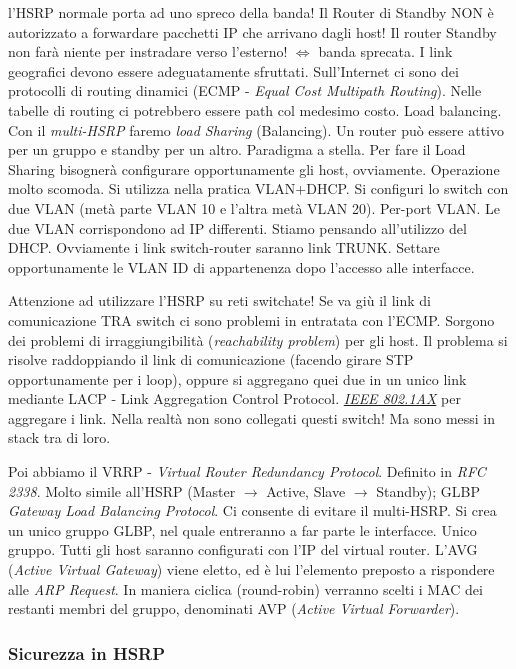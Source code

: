 l'HSRP normale porta ad uno spreco della banda! Il Router di Standby NON è autorizzato a forwardare pacchetti IP che arrivano dagli host! Il router Standby non farà niente per instradare verso l'esterno! $\iff$ banda sprecata. I link geografici devono essere adeguatamente sfruttati. Sull'Internet ci sono dei protocolli di routing dinamici (ECMP - \textit{Equal Cost Multipath Routing}). Nelle tabelle di routing ci potrebbero essere path col medesimo costo. Load balancing. Con il \textit{multi-HSRP} faremo \textit{load Sharing} (Balancing). Un router può essere attivo per un gruppo e standby per un altro. Paradigma a stella. Per fare il Load Sharing bisognerà configurare opportunamente gli host, ovviamente. Operazione molto scomoda. Si utilizza nella pratica VLAN+DHCP. Si configuri lo switch con due VLAN (metà parte VLAN 10 e l'altra metà VLAN 20). Per-port VLAN. Le due VLAN corrispondono ad IP differenti. Stiamo pensando all'utilizzo del DHCP. Ovviamente i link switch-router saranno link TRUNK. Settare opportunamente le VLAN ID di appartenenza dopo l'accesso alle interfacce.

Attenzione ad utilizzare l'HSRP su reti switchate! Se va giù il link di comunicazione TRA switch ci sono problemi in entratata con l'ECMP. Sorgono dei problemi di irraggiungibilità (\textit{reachability problem}) per gli host. Il problema si risolve raddoppiando il link di comunicazione (facendo girare STP opportunamente per i loop), oppure si aggregano quei due in un unico link mediante LACP - Link Aggregation Control Protocol. \underline{\textit{IEEE 802.1AX}} per aggregare i link. Nella realtà non sono collegati questi switch! Ma sono messi in stack tra di loro.

Poi abbiamo il VRRP - \textit{Virtual Router Redundancy Protocol}. Definito in \textit{RFC 2338}. Molto simile all'HSRP (Master $\rightarrow$ Active, Slave $\rightarrow$ Standby); GLBP \textit{Gateway Load Balancing Protocol}. Ci consente di evitare il multi-HSRP. Si crea un unico gruppo GLBP, nel quale entreranno a far parte le interfacce. Unico gruppo. Tutti gli host saranno configurati con l'IP del virtual router. L'AVG (\textit{Active Virtual Gateway}) viene eletto, ed è lui l'elemento preposto a rispondere alle \textit{ARP Request}. In maniera ciclica (round-robin) verranno scelti i MAC dei restanti membri del gruppo, denominati AVP (\textit{Active Virtual Forwarder}). 

\subsubsection{Sicurezza in HSRP}

